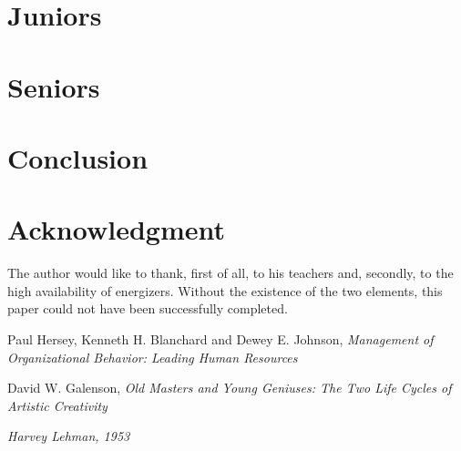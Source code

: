 \documentclass[conference]{IEEEtran}
\begin{document}
\section{Juniors}
\section{Seniors}

\newpage
\section{Conclusion}

\section*{Acknowledgment}
The author would like to thank, first of all, to his teachers and, secondly, to the high availability of energizers. Without the existence of the two elements, this paper could not have been successfully completed. 

\newpage
\begin{thebibliography}{99}


Paul Hersey, Kenneth H. Blanchard and Dewey E. Johnson, \emph{Management of Organizational Behavior: Leading Human Resources}

David W. Galenson, \emph{Old Masters and Young Geniuses: The Two Life Cycles of Artistic Creativity}

\emph{Harvey Lehman, 1953} 

\end{thebibliography}
\end{document}
